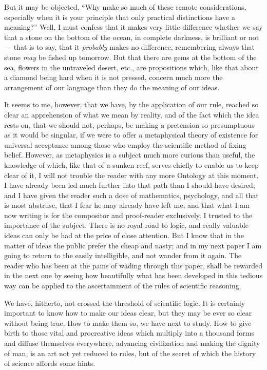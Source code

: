 \documentclass[]{article}
\begin{document}
But it may be objected, ``Why make so much of these remote considerations, especially when it is your principle that only practical distinctions have a meaning?'' Well, I must confess that it makes very little difference whether we say that a stone on the bottom of the ocean, in complete darkness, is brilliant or not--- that is to say, that it
\emph{probably} makes no difference, remembering always that stone \emph{may} be fished up tomorrow. But that there are gems at the bottom of the sea, flowers in the untraveled desert, etc., are propositions which,  like that about a diamond being hard when it is not pressed, concern much more the arrangement of our language than they do the meaning of our ideas. 

It seems to me, however, that we have, by the
application of our rule, reached so clear an apprehension of what we mean by reality, and of the fact which the idea rests on, that we should not, perhaps, be making a pretension so presumptuous as it would be singular, if we were to
offer a metaphysical theory of existence for universal acceptance among those who employ the scientific method of fixing belief. However, as metaphysics is a subject much more curious than useful, the knowledge of which, like that of a sunken reef, serves chiefly to enable us to keep clear of it, I will not trouble the reader with any more Ontology at this moment. I have already been led much further into that path than I should have desired; and I have given the reader such a dose of mathematics, psychology, and all that is most abstruse, that I fear he may already have left me, and that what I am now writing is for the compositor and proof-reader exclusively. I trusted to the
importance of the subject. There is no royal road to logic, and really valuable ideas can only be had at the price of close attention. But I know that in the matter of ideas the public prefer the cheap and nasty; and in my next paper I am going to return to the easily intelligible, and not wander from it again. The reader who has been at the pains of wading through this paper, shall be rewarded in the next one by seeing how beautifully what has been developed in this tedious way can be applied to the ascertainment of the rules of scientific reasoning.


We have, hitherto, not crossed the threshold of scientific logic. It  is certainly important to know how to make our ideas clear, but they may be ever so clear without being true. How to make them so, we have next to study. How to give birth to those vital and procreative ideas which multiply into a thousand forms and diffuse themselves everywhere, advancing civilization and making the dignity of man, is an art not yet reduced to rules, but of the secret of which the history of science affords some hints.
\end{document}
